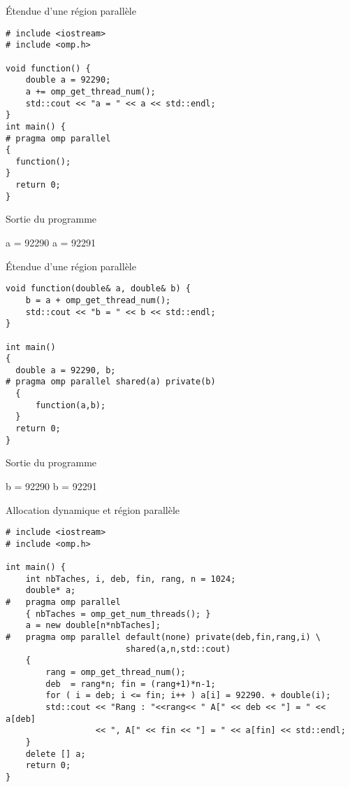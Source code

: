 \documentclass[handout,francais]{beamer}
\begin{document}
\begin{frame}[fragile]{\'Etendue d'une région parallèle}
 
\begin{lstlisting}
# include <iostream>
# include <omp.h>

void function() {
    double a = 92290;
    a += omp_get_thread_num();
    std::cout << "a = " << a << std::endl;
}
int main() {
# pragma omp parallel
{
  function();
}
  return 0;
}
\end{lstlisting}

\begin{block}{Sortie du programme}
\begin{semiverbatim}
a = 92290
a = 92291
\end{semiverbatim}
\end{block} 
\end{frame}

\begin{frame}[fragile]{\'Etendue d'une région parallèle}

\begin{lstlisting}
void function(double& a, double& b) {
    b = a + omp_get_thread_num();
    std::cout << "b = " << b << std::endl;
}

int main()
{
  double a = 92290, b;
# pragma omp parallel shared(a) private(b)
  {
      function(a,b);
  }
  return 0;
}
\end{lstlisting}

\begin{block}{Sortie du programme}
\begin{semiverbatim}
b = 92290
b = 92291
\end{semiverbatim}
\end{block}
\end{frame}

\begin{frame}[fragile]{Allocation dynamique et région parallèle}
\begin{lstlisting}
# include <iostream>
# include <omp.h>

int main() {
    int nbTaches, i, deb, fin, rang, n = 1024;
    double* a;
#   pragma omp parallel
    { nbTaches = omp_get_num_threads(); }
    a = new double[n*nbTaches];    
#   pragma omp parallel default(none) private(deb,fin,rang,i) \
                        shared(a,n,std::cout)
    {
        rang = omp_get_thread_num();
        deb  = rang*n; fin = (rang+1)*n-1;
        for ( i = deb; i <= fin; i++ ) a[i] = 92290. + double(i);
        std::cout << "Rang : "<<rang<< " A[" << deb << "] = " << a[deb]
                  << ", A[" << fin << "] = " << a[fin] << std::endl;
    }
    delete [] a;
    return 0;
}
\end{lstlisting}
\end{frame}
\end{document}
